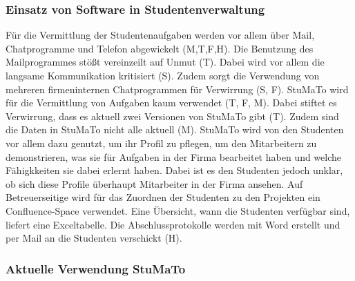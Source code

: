 \documentclass[
  12pt,
  ngerman,
  a4paper,
]{article}
\begin{document}
\hypertarget{einsatz-von-software-in-studentenverwaltung}{%
\subsubsection{Einsatz von Software in
Studentenverwaltung}\label{einsatz-von-software-in-studentenverwaltung}}

Für die Vermittlung der Studentenaufgaben werden vor allem über Mail,
Chatprogramme und Telefon abgewickelt (M,T,F,H). Die Benutzung des
Mailprogrammes stößt vereinzeilt auf Unmut (T). Dabei wird vor allem die
langsame Kommunikation kritisiert (S). Zudem sorgt die Verwendung von
mehreren firmeninternen Chatprogrammen für Verwirrung (S, F). StuMaTo
wird für die Vermittlung von Aufgaben kaum verwendet (T, F, M). Dabei
stiftet es Verwirrung, dass es aktuell zwei Versionen von StuMaTo gibt
(T). Zudem sind die Daten in StuMaTo nicht alle aktuell (M). StuMaTo
wird von den Studenten vor allem dazu genutzt, um ihr Profil zu pflegen,
um den Mitarbeitern zu demonstrieren, was sie für Aufgaben in der Firma
bearbeitet haben und welche Fähigkkeiten sie dabei erlernt haben. Dabei
ist es den Studenten jedoch unklar, ob sich diese Profile überhaupt
Mitarbeiter in der Firma ansehen. Auf Betreuerseitige wird für das
Zuordnen der Studenten zu den Projekten ein Confluence-Space verwendet.
Eine Übersicht, wann die Studenten verfügbar sind, liefert eine
Exceltabelle. Die Abschlussprotokolle werden mit Word erstellt und per
Mail an die Studenten verschickt (H).

\hypertarget{aktuelle-verwendung-stumato}{%
\subsubsection{Aktuelle Verwendung
StuMaTo}\label{aktuelle-verwendung-stumato}}
\end{document}
